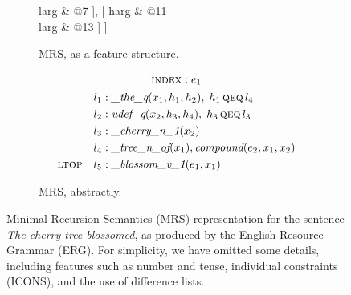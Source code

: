 \documentclass[output=paper,nonflat]{langsci/langscibook}
\begin{document}
\begin{figure}
\begin{subfigure}{\textwidth}
\begin{avm}
				larg & @7 ],
			[
				harg & @{11} \\
				larg & @{13} ] \;\Bigg\rangle ]
	\end{avm}
	\caption{MRS, as a feature structure.}
\end{subfigure}
\begin{subfigure}{\textwidth}
	\centering
	\setlength{\abovedisplayskip}{1ex}
	\setlength{\belowdisplayskip}{1ex}
	\begin{gather*}
		\textsc{index} : e_1 \\
		\begin{aligned}
			l_1 &: \textit{\_the\_q}(x_1,h_1,h_2),\; h_1 \,\textsc{qeq}\, l_4 \\
			l_2 &: \textit{udef\_q}(x_2,h_3,h_4),\; h_3 \,\textsc{qeq}\, l_3 \\
			l_3 &: \textit{\_cherry\_n\_1}(x_2) \\
			l_4 &: \textit{\_tree\_n\_of}(x_1), \textit{compound}(e_2,x_1,x_2) \\
			\textsc{ltop}\quad l_5 &: \textit{\_blossom\_v\_1}(e_1,x_1)
		\end{aligned}
	\end{gather*}
	\caption{MRS, abstractly.}
\end{subfigure}
\caption{%
	Minimal Recursion Semantics (MRS)
	representation for the sentence \emph{The cherry tree blossomed},
	as produced by the English Resource Grammar (ERG).
	For simplicity, we have omitted some details, including
	features such as number and tense,
	individual constraints (ICONS),
	and the use of difference lists.
}
\label{cl:fig:mrs}
\end{figure}
\end{document}
